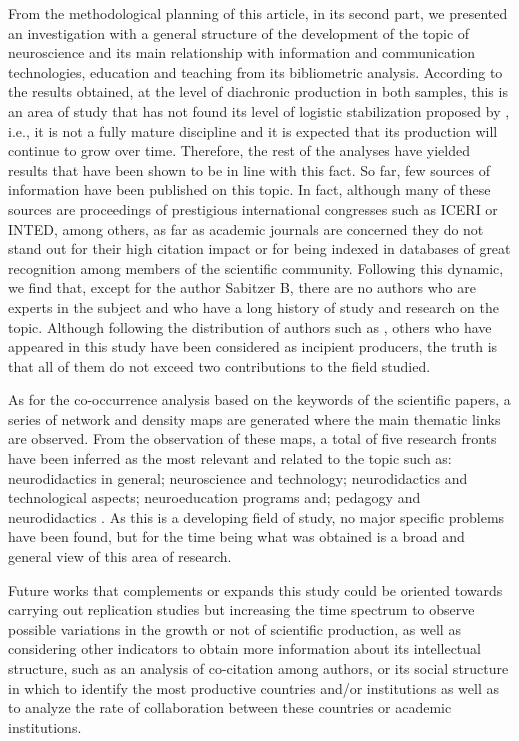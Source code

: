 \documentclass[english]{textolivre}
\begin{document}
From the methodological planning of this article, in its second part, we presented an investigation with a general structure of the development of the topic of neuroscience and its main relationship with information and communication technologies, education and teaching from its bibliometric analysis. According to the results obtained, at the level of diachronic production in both samples, this is an area of study that has not found its level of logistic stabilization proposed by \textcite{price_autoradiographic_1973}, i.e., it is not a fully mature discipline and it is expected that its production will continue to grow over time. Therefore, the rest of the analyses have yielded results that have been shown to be in line with this fact. So far, few sources of information have been published on this topic. In fact, although many of these sources are proceedings of prestigious international congresses such as ICERI or INTED, among others, as far as academic journals are concerned they do not stand out for their high citation impact or for being indexed in databases of great recognition among members of the scientific community. Following this dynamic, we find that, except for the author Sabitzer B, there are no authors who are experts in the subject and who have a long history of study and research on the topic. Although following the distribution of authors such as \textcite{lotka_frequency_1926}, others who have appeared in this study have been considered as incipient producers, the truth is that all of them do not exceed two contributions to the field studied.

As for the co-occurrence analysis based on the keywords of the scientific papers, a series of network and density maps are generated where the main thematic links are observed. From the observation of these maps, a total of five research fronts have been inferred as the most relevant and related to the topic such as: neurodidactics in general; neuroscience and technology; neurodidactics and technological aspects; neuroeducation programs and; pedagogy and neurodidactics \cite{_nieto_bases_2014}. As this is a developing field of study, no major specific problems have been found, but for the time being what was obtained is a broad and general view of this area of research.

Future works that complements or expands this study could be oriented towards carrying out replication studies but increasing the time spectrum to observe possible variations in the growth or not of scientific production, as well as considering other indicators to obtain more information about its intellectual structure, such as an analysis of co-citation among authors, or its social structure in which to identify the most productive countries and/or institutions as well as to analyze the rate of collaboration between these countries or academic institutions.  
\end{document}
